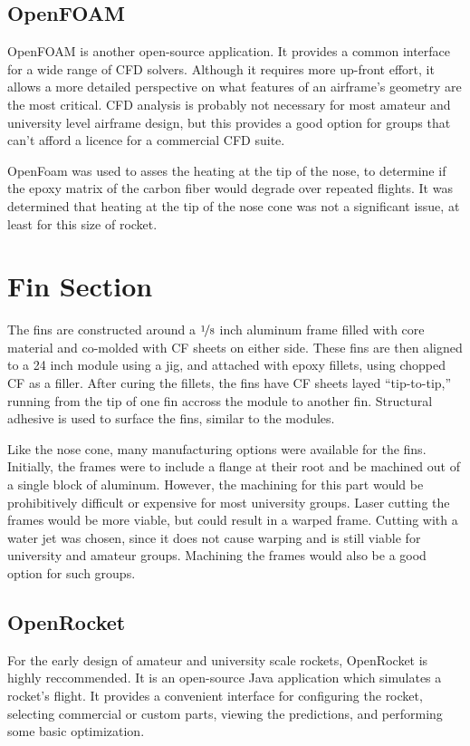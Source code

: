 \documentclass{aiaa-tc}%
\begin{document}
\subsection{OpenFOAM}
OpenFOAM is another open-source application. It provides a common interface for a wide range of CFD solvers.
Although it requires more up-front effort, it allows a more detailed perspective on what features of an airframe's geometry are the most critical. 
CFD analysis is probably not necessary for most amateur and university level airframe design, but this provides a good option for groups that can't afford a licence for a commercial CFD suite. 

OpenFoam was used to asses the heating at the tip of the nose, to determine if the epoxy matrix of the carbon fiber would degrade over repeated flights.
It was determined that heating at the tip of the nose cone was not a significant issue, at least for this size of rocket.

\section{Fin Section}

The fins are constructed around a $\nicefrac{1}{8}$ inch aluminum frame filled with core material and co-molded with CF sheets on either side. 
These fins are then aligned to a 24 inch module using a jig, and attached with epoxy fillets, using chopped CF as a filler. 
After curing the fillets, the fins have CF sheets layed ``tip-to-tip,'' running from the tip of one fin accross the module to another fin. 
Structural adhesive is used to surface the fins, similar to the modules. 

Like the nose cone, many manufacturing options were available for the fins. 
Initially, the frames were to include a flange at their root and be machined out of a single block of aluminum. 
However, the machining for this part would be prohibitively difficult or expensive for most university groups. 
Laser cutting the frames would be more viable, but could result in a warped frame.
Cutting with a water jet was chosen, since it does not cause warping and is still viable for university and amateur groups. 
Machining the frames would also be a good option for such groups. 

\subsection{OpenRocket}
For the early design of amateur and university scale rockets, OpenRocket\cite{OR} is highly reccommended. 
It is an open-source Java application which simulates a rocket's flight. It provides a convenient interface for configuring the rocket, selecting commercial or custom parts, viewing the predictions, and performing some basic optimization. 
\end{document}
